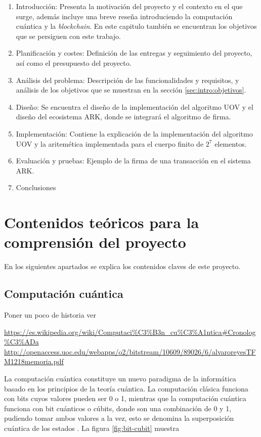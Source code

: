 \begin{enumerate}
	\item Introducción: Presenta la motivación del proyecto y el contexto en el que surge, además incluye una breve reseña introduciendo la computación cuántica y la \textit{blockchain}. En este capitulo también se encuentran los objetivos que se persiguen con este trabajo.
	\item Planificación y costes: Definición de las entregas y seguimiento del proyecto, así como el presupuesto del proyecto.
	\item Análisis del problema: Descripción de las funcionalidades y requisitos, y análisis de los objetivos que se muestran en la sección \ref{sec:intro:objetivos}.
	\item Diseño: Se encuentra el diseño de la implementación del algoritmo UOV y el diseño del ecosistema ARK, donde se integrará el algoritmo de firma.
	\item Implementación: Contiene la explicación de la implementación del algoritmo UOV y la aritemética implementada para el cuerpo finito de $2^7$ elementos.
	\item Evaluación y pruebas: Ejemplo de la firma de una transacción en el sistema ARK.
	\item Conclusiones
\end{enumerate}

\section{Contenidos teóricos para la comprensión del proyecto}

En los siguientes apartados se explica los contenidos claves de este proyecto.

\subsection{Computación cuántica}
Poner un poco de historia ver 

\url{https://es.wikipedia.org/wiki/Computaci%C3%B3n_cu%C3%A1ntica#Cronolog%C3%ADa}
\url{http://openaccess.uoc.edu/webapps/o2/bitstream/10609/89026/6/alvaroreyesTFM1218memoria.pdf}

La computación cuántica constituye un nuevo paradigma de la informática basado en los principios de la teoría cuántica. La computación clásica funciona con bits cuyos valores pueden ser 0 o 1, mientras que la computación cuántica funciona con bit cuánticos o cúbits, donde son una combinación de 0 y 1, pudiendo tomar ambos valores a la vez, esto se denomina la superposición cuántica de los estados \cite{computacion-cuantica-criptografia}.
La figura \ref{fig:bit-cubit} muestra

